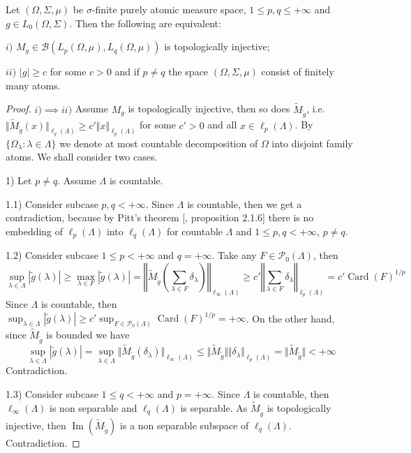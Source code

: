 \begin{proposition}\label{TopInjMultOpCharacOnPureAtomMeasSp} Let $(\Omega,\Sigma,\mu)$ be $\sigma$-finite purely atomic measure space, $1\leq p,q\leq +\infty$ and $g\in L_0(\Omega,\Sigma)$. Then the following are equivalent:

$i)$ $M_g\in\mathcal{B}(L_p(\Omega,\mu),L_q(\Omega,\mu))$ is topologically injective;

$ii)$ $|g|\geq c$ for some $c>0$ and if $p\neq q$ the space $(\Omega,\Sigma,\mu)$ consist of finitely many atoms.
\end{proposition}
\begin{proof}
$i)$$\implies$$ ii)$ Assume $M_g$ is topologically injective, then so does $\widetilde{M}_{\widetilde{g}}$, i.e. $\Vert\widetilde{M}_{\widetilde{g}}(x)\Vert_{\ell_q(\Lambda)}\geq c'\Vert x\Vert_{\ell_p(\Lambda)}$ for some $c'>0$ and all $x\in\ell_p(\Lambda)$. By $\{\Omega_\lambda:\lambda\in\Lambda\}$ we denote at most countable decomposition  of $\Omega$ into disjoint family atoms. We shall consider two cases.

1) Let $p\neq q$. Assume $\Lambda$ is countable. 

1.1) Consider subcase $p,q<+\infty$. Since $\Lambda$ is countable, then we get a  contradiction, because by Pitt's theorem [\cite{KalAlbTopicsBanSpTh}, proposition 2.1.6] there is no embedding of $\ell_p(\Lambda)$ into $\ell_q(\Lambda)$ for countable $\Lambda$ and $1\leq p,q< +\infty$, $p\neq q$. 

1.2) Consider subcase $1\leq p <+\infty$ and $q=+\infty$. Take any $F\in\mathcal{P}_0(\Lambda)$, then 
$$
\sup_{\lambda\in\Lambda}|\widetilde{g}(\lambda)|
\geq\max_{\lambda\in F}|\widetilde{g}(\lambda)|
=\left\Vert\widetilde{M}_{\widetilde{g}}\left(\sum_{\lambda\in F}\delta_\lambda\right)\right\Vert_{\ell_\infty(\Lambda)}
\geq c'\left\Vert\sum_{\lambda\in F}\delta_\lambda\right\Vert_{\ell_p(\Lambda)}
=c'\operatorname{Card}(F)^{1/p}
$$
Since $\Lambda$ is countable, then $\sup_{\lambda\in\Lambda}|\widetilde{g}(\lambda)|\geq c'\sup_{F\in\mathcal{P}_0(\Lambda)}\operatorname{Card}(F)^{1/p}=+\infty$. On the other hand, since $\widetilde{M}_{\widetilde{g}}$ is bounded we have 
$$\sup_{\lambda\in\Lambda}|\widetilde{g}(\lambda)|
=\sup_{\lambda\in\Lambda}\Vert\widetilde{M}_{\widetilde{g}}(\delta_\lambda)\Vert_{\ell_\infty(\Lambda)}
\leq\Vert\widetilde{M}_{\widetilde{g}}\Vert\Vert \delta_\lambda\Vert_{\ell_p(\Lambda)}
=\Vert\widetilde{M}_{\widetilde{g}}\Vert<+\infty
$$
Contradiction.

1.3) Consider subcase $1\leq q<+\infty$ and $p=+\infty$. Since $\Lambda$ is countable, then $\ell_\infty(\Lambda)$ is non separable and $\ell_q(\Lambda)$ is separable. As $\widetilde{M}_{\widetilde{g}}$ is topologically injective, then $\operatorname{Im}(\widetilde{M}_{\widetilde{g}})$ is a non separable subspace of $\ell_q(\Lambda)$. Contradiction.


\end{proof}
